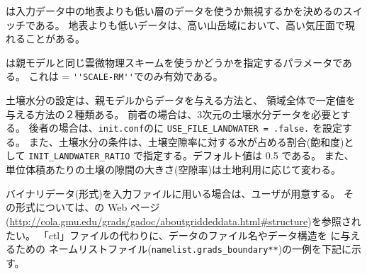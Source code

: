 は入力データ中の地表よりも低い層のデータを使うか無視するかを決めるのスイッチである。
地表よりも低いデータは、高い山岳域において、高い気圧面で現れることがある。


は親モデルと同じ雲微物理スキームを使うかどうかを指定するパラメータである。
これは = \verb|''SCALE-RM''|でのみ有効である。



土壌水分の設定は、親モデルからデータを与える方法と、
領域全体で一定値を与える方法の２種類ある。
前者の場合は、3次元の土壌水分データを必要とする。
後者の場合は、\verb|init.conf|のに
\verb|USE_FILE_LANDWATER = .false.| を設定する。
また、土壌水分の条件は、土壌空隙率に対する水が占める割合(飽和度)として
\verb|INIT_LANDWATER_RATIO| で指定する。デフォルト値は 0.5 である。
また、単位体積あたりの土壌の隙間の大きさ(空隙率)は土地利用に応じて変わる。\\

バイナリデータ({\grads}形式)を入力ファイルに用いる場合は、ユーザが用意する。
その形式については、\grads の Web ページ
(\url{http://cola.gmu.edu/grads/gadoc/aboutgriddeddata.html#structure})を参照されたい。
「ctl」ファイルの代わりに、データのファイル名やデータ構造を \scalerm に与えるための
ネームリストファイル(\verb|namelist.grads_boundary**|)の一例を下記に示す。\\

